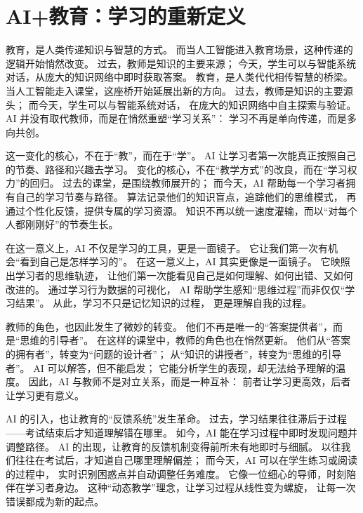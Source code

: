 \section{AI+教育：学习的重新定义}

教育，是人类传递知识与智慧的方式。  
而当人工智能进入教育场景，这种传递的逻辑开始悄然改变。  
过去，教师是知识的主要来源；  
今天，学生可以与智能系统对话，从庞大的知识网络中即时获取答案。  
教育，是人类代代相传智慧的桥梁。  
当人工智能走入课堂，这座桥开始延展出新的方向。  
过去，教师是知识的主要源头；  
而今天，学生可以与智能系统对话，  
在庞大的知识网络中自主探索与验证。  
AI 并没有取代教师，而是在悄然重塑“学习关系”：  
学习不再是单向传递，而是多向共创。

这一变化的核心，不在于“教”，而在于“学”。  
AI 让学习者第一次能真正按照自己的节奏、路径和兴趣去学习。  
变化的核心，不在“教学方式”的改良，而在“学习权力”的回归。  
过去的课堂，是围绕教师展开的；  
而今天，AI 帮助每一个学习者拥有自己的学习节奏与路径。  
算法记录他们的知识盲点，追踪他们的思维模式，  
再通过个性化反馈，提供专属的学习资源。  
知识不再以统一速度灌输，而以“对每个人都刚刚好”的节奏生长。

在这一意义上，AI 不仅是学习的工具，更是一面镜子。  
它让我们第一次有机会“看到自己是怎样学习的”。  
在这一意义上，AI 其实更像是一面镜子。  
它映照出学习者的思维轨迹，  
让他们第一次能看见自己是如何理解、如何出错、又如何改进的。  
通过学习行为数据的可视化，  
AI 帮助学生感知“思维过程”而非仅仅“学习结果”。  
从此，学习不只是记忆知识的过程，  
更是理解自我的过程。

教师的角色，也因此发生了微妙的转变。  
他们不再是唯一的“答案提供者”，而是“思维的引导者”。  
在这样的课堂中，教师的角色也在悄然更新。  
他们从“答案的拥有者”，转变为“问题的设计者”；  
从“知识的讲授者”，转变为“思维的引导者”。  
AI 可以解答，但不能启发；  
它能分析学生的表现，却无法给予理解的温度。  
因此，AI 与教师不是对立关系，而是一种互补：  
前者让学习更高效，后者让学习更有意义。

AI 的引入，也让教育的“反馈系统”发生革命。  
过去，学习结果往往滞后于过程——考试结束后才知道理解错在哪里。  
如今，AI 能在学习过程中即时发现问题并调整路径。  
AI 的出现，让教育的反馈机制变得前所未有地即时与细腻。  
以往我们往往在考试后，才知道自己哪里理解偏差；  
而今天，AI 可以在学生练习或阅读的过程中，  
实时识别困惑点并自动调整任务难度。  
它像一位细心的导师，时刻陪伴在学习者身边。  
这种“动态教学”理念，让学习过程从线性变为螺旋，  
让每一次错误都成为新的起点。

